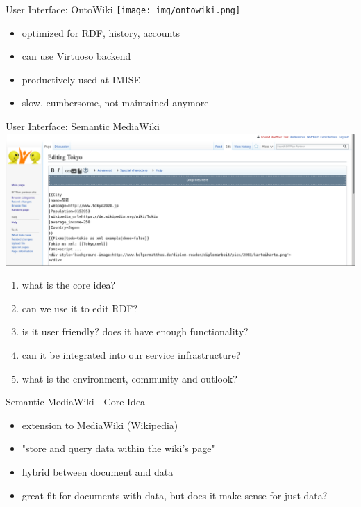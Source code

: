 \documentclass[aspectratio=1610]{beamer}
\begin{document}
\begin{frame}{User Interface: OntoWiki}
\centering
\texttt{[image: img/ontowiki.png]}
\begin{itemize}
\item optimized for RDF, history, accounts
\item can use Virtuoso backend
\item productively used at IMISE
\item slow, cumbersome, not maintained anymore
\end{itemize}
\end{frame}

\begin{frame}{User Interface: Semantic MediaWiki}
\centering
\includegraphics[width=0.6\paperwidth]{img/smw-tokyo.png}
\begin{enumerate}
\item what is the core idea?
\item can we use it to edit RDF?
\item is it user friendly? does it have enough functionality?
\item can it be integrated into our service infrastructure?
\item what is the environment, community and outlook?
\end{enumerate}
\end{frame}

\begin{frame}{Semantic MediaWiki---Core Idea}
\begin{itemize}
\item extension to MediaWiki (Wikipedia)
\item "store and query data within the wiki's page" 
\item hybrid between document and data
\item great fit for documents with data, but does it make sense for just data?
\end{itemize}
\end{frame}
\end{document}
